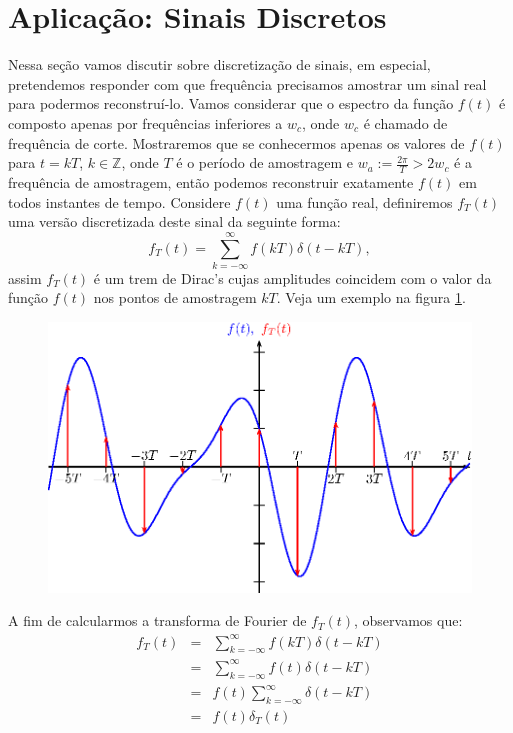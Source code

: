 \documentclass[a4paper,10pt]{book}
\begin{document}
 \section{Aplicação: Sinais Discretos}
 Nessa seção vamos discutir sobre discretização de sinais, em especial, pretendemos responder com que frequência precisamos amostrar um sinal real para podermos reconstruí-lo. Vamos considerar que o espectro da função $f(t)$ é composto apenas por frequências inferiores a $w_c$, onde $w_c$ é chamado de frequência de corte. Mostraremos que se conhecermos apenas os valores de $f(t)$ para $t=kT$, $k\in\mathbb{Z}$, onde $T$ é o período de amostragem e $w_a:=\frac{2\pi }{T}>2w_c$  é a frequência de amostragem, então podemos reconstruir exatamente $f(t)$ em todos instantes de tempo.
 Considere $f(t)$ uma função real, definiremos $f_T(t)$ uma versão discretizada deste sinal da seguinte forma:
 \begin{equation}
 f_T(t)=\sum_{k=-\infty}^\infty f(kT) \delta (t-kT),
 \end{equation}
 assim $f_T(t)$ é um trem de Dirac's cujas amplitudes coincidem com o valor da função $f(t)$ nos pontos de amostragem $kT$. Veja um exemplo na figura \ref{sinal_discreto}.
 \begin{figure}[!ht]
 \begin{center}
 \includegraphics{figs/cap_propriedades_transformada_figura_8}\end{center}
 \caption{\label{sinal_discreto}}
 \end{figure}
 A fim de calcularmos a transforma de Fourier de $f_T(t)$, observamos que:
 \begin{eqnarray*}
 f_T(t)&=&\sum_{k=-\infty}^\infty f(kT) \delta (t-kT)\\
 &=&\sum_{k=-\infty}^\infty f(t) \delta (t-kT)\\
 &=&f(t)\sum_{k=-\infty}^\infty \delta (t-kT)\\
 &=&f(t)\delta_T(t)
 \end{eqnarray*}
\end{document}
